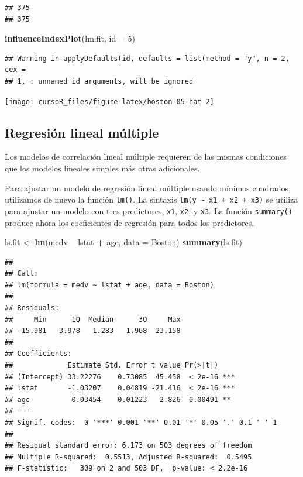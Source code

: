 \documentclass[]{book}
\newenvironment{Shaded}{\begin{snugshade}}{\end{snugshade}}
\newcommand{\KeywordTok}[1]{\textcolor[rgb]{0.13,0.29,0.53}{\textbf{#1}}}
\newcommand{\DataTypeTok}[1]{\textcolor[rgb]{0.13,0.29,0.53}{#1}}
\newcommand{\DecValTok}[1]{\textcolor[rgb]{0.00,0.00,0.81}{#1}}
\newcommand{\StringTok}[1]{\textcolor[rgb]{0.31,0.60,0.02}{#1}}
\newcommand{\OperatorTok}[1]{\textcolor[rgb]{0.81,0.36,0.00}{\textbf{#1}}}
\newcommand{\NormalTok}[1]{#1}
\begin{document}
\begin{verbatim}
## 375 
## 375
\end{verbatim}

\begin{Shaded}
\begin{Highlighting}[]
\KeywordTok{influenceIndexPlot}\NormalTok{(lm.fit, }\DataTypeTok{id =} \DecValTok{5}\NormalTok{)}
\end{Highlighting}
\end{Shaded}

\begin{verbatim}
## Warning in applyDefaults(id, defaults = list(method = "y", n = 2, cex =
## 1, : unnamed id arguments, will be ignored
\end{verbatim}

\begin{center}\texttt{[image: cursoR\_files/figure-latex/boston-05-hat-2]} \end{center}

\subsection{Regresión lineal
múltiple}\label{regresiuxf3n-lineal-muxfaltiple}

Los modelos de correlación lineal múltiple requieren de las mismas
condiciones que los modelos lineales simples más otras adicionales.

Para ajustar un modelo de regresión lineal múltiple usando mínimos
cuadrados, utilizamos de nuevo la función \texttt{lm()}. La sintaxis
\texttt{lm(y\ \textasciitilde{}\ x1\ +\ x2\ +\ x3)} se utiliza para
ajustar un modelo con tres predictores, \texttt{x1}, \texttt{x2}, y
\texttt{x3}. La función \texttt{summary()} produce ahora los
coeficientes de regresión para todos los predictores.

\begin{Shaded}
\begin{Highlighting}[]
\NormalTok{ls.fit <-}\StringTok{ }\KeywordTok{lm}\NormalTok{(medv }\OperatorTok{~}\StringTok{ }\NormalTok{lstat }\OperatorTok{+}\StringTok{ }\NormalTok{age, }\DataTypeTok{data =}\NormalTok{ Boston)}
\KeywordTok{summary}\NormalTok{(ls.fit)}
\end{Highlighting}
\end{Shaded}

\begin{verbatim}
## 
## Call:
## lm(formula = medv ~ lstat + age, data = Boston)
## 
## Residuals:
##     Min      1Q  Median      3Q     Max 
## -15.981  -3.978  -1.283   1.968  23.158 
## 
## Coefficients:
##             Estimate Std. Error t value Pr(>|t|)    
## (Intercept) 33.22276    0.73085  45.458  < 2e-16 ***
## lstat       -1.03207    0.04819 -21.416  < 2e-16 ***
## age          0.03454    0.01223   2.826  0.00491 ** 
## ---
## Signif. codes:  0 '***' 0.001 '**' 0.01 '*' 0.05 '.' 0.1 ' ' 1
## 
## Residual standard error: 6.173 on 503 degrees of freedom
## Multiple R-squared:  0.5513, Adjusted R-squared:  0.5495 
## F-statistic:   309 on 2 and 503 DF,  p-value: < 2.2e-16
\end{verbatim}
\end{document}
